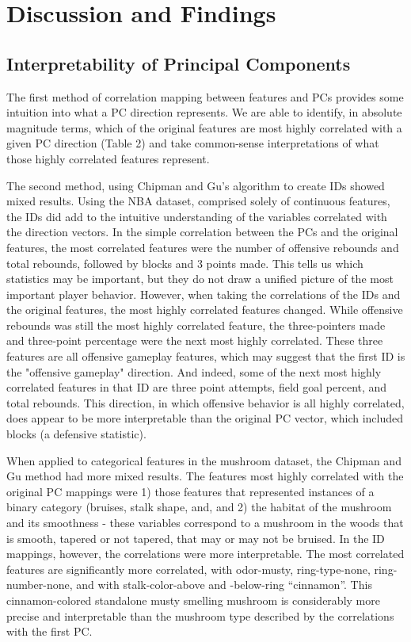 \documentclass{article}
\begin{document}
\section{Discussion and Findings}{
\subsection{Interpretability of Principal Components}{
The first method of correlation mapping between features and PCs provides some intuition into what a PC direction represents. We are able to identify, in absolute magnitude terms, which of the original features are most highly correlated with a given PC direction (Table 2) and take common-sense interpretations of what those highly correlated features represent.

The second method, using Chipman and Gu’s algorithm to create IDs showed mixed results. Using the NBA dataset, comprised solely of continuous features, the IDs did add to the intuitive understanding of the variables correlated with the direction vectors. In the simple correlation between the PCs and the original features, the most correlated features were the number of offensive rebounds and total rebounds, followed by blocks and 3 points made. This tells us which statistics may be important, but they do not draw a unified picture of the most important player behavior. However, when taking the correlations of the IDs and the original features, the most highly correlated features changed. While offensive rebounds was still the most highly correlated feature, the three-pointers made and three-point percentage were the next most highly correlated. These three features are all offensive gameplay features, which may suggest that the first ID is the "offensive gameplay" direction. And indeed, some of the next most highly correlated features in that ID are three point attempts, field goal percent, and total rebounds. This direction, in which offensive behavior is all highly correlated, does appear to be more interpretable than the original PC vector, which included blocks (a defensive statistic).

When applied to categorical features in the mushroom dataset, the Chipman and Gu method had more mixed results. The features most highly correlated with the original PC mappings were 1) those features that represented instances of a binary category (bruises, stalk shape, and, and 2) the habitat of the mushroom and its smoothness - these variables correspond to a mushroom in the woods that is smooth, tapered or not tapered, that may or may not be bruised. In the ID mappings, however, the correlations were more interpretable. The most correlated features are significantly more correlated, with odor-musty, ring-type-none, ring-number-none, and with stalk-color-above and -below-ring “cinnamon”. This cinnamon-colored standalone musty smelling mushroom is considerably more precise and interpretable than the mushroom type described by the correlations with the first PC.

}}
\end{document}
